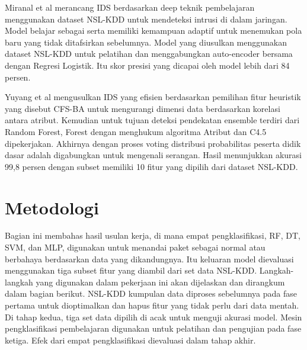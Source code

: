 \documentclass[conference]{IEEEtran}
\begin{document}
Miranal et al\cite{gurung2019deep} merancang IDS berdasarkan deep teknik pembelajaran menggunakan dataset NSL-KDD untuk mendeteksi intrusi di dalam jaringan. Model belajar sebagai serta memiliki kemampuan adaptif untuk menemukan pola baru yang tidak ditafsirkan sebelumnya. Model yang diusulkan menggunakan dataset NSL-KDD untuk pelatihan dan menggabungkan auto-encoder bersama dengan Regresi Logistik. Itu skor presisi yang dicapai oleh model lebih dari 84 persen. 

Yuyang et al\cite{zhou2020building} mengusulkan IDS yang efisien berdasarkan pemilihan fitur heuristik yang disebut CFS-BA untuk mengurangi dimensi data berdasarkan korelasi antara atribut. Kemudian untuk tujuan deteksi pendekatan ensemble terdiri dari Random Forest, Forest dengan menghukum algoritma Atribut dan C4.5 dipekerjakan. Akhirnya dengan proses voting distribusi probabilitas peserta didik dasar adalah digabungkan untuk mengenali serangan. Hasil menunjukkan akurasi 99,8 persen dengan subset memiliki 10 fitur yang dipilih dari dataset NSL-KDD.

\section{Metodologi}

Bagian ini membahas hasil usulan kerja, di mana empat pengklasifikasi, RF, DT, SVM, dan MLP, digunakan untuk menandai paket sebagai normal atau berbahaya berdasarkan data yang dikandungnya. Itu keluaran model dievaluasi menggunakan tiga subset fitur yang diambil dari set data NSL-KDD. Langkah-langkah yang digunakan dalam pekerjaan ini akan dijelaskan dan dirangkum dalam bagian berikut. NSL-KDD kumpulan data diproses sebelumnya pada fase pertama untuk dioptimalkan dan hapus fitur yang tidak perlu dari data mentah. Di tahap kedua, tiga set data dipilih di acak untuk menguji akurasi model. Mesin pengklasifikasi pembelajaran digunakan untuk pelatihan dan pengujian pada fase ketiga. Efek dari empat pengklasifikasi dievaluasi dalam tahap akhir.
\end{document}
